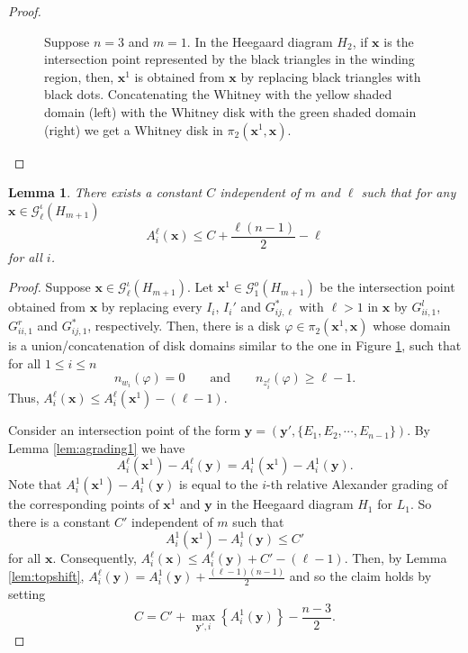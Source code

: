 \documentclass{amsart}
\newtheorem{lemma}[theorem]{Lemma}
\newcommand{\G}{\mathcal{G}}
\newcommand{\x}{\mathbf{x}}
\newcommand{\y}{\mathbf{y}}
\def\x{\mathbf{x}}
\def\y{\mathbf{y}}
\begin{document}
\begin{proof}
\begin{figure}[h]
\begin{tikzpicture}
   \end{tikzpicture}
\caption{Suppose $n=3$ and $m=1$. In the Heegaard diagram $H_{2}$, if $\x$ is the intersection point represented by the black triangles in the winding region, then, $\x^1$ is obtained from $\x$ by replacing black triangles with black dots. Concatenating the Whitney with the  yellow shaded domain (left) with the Whitney disk with the green shaded domain (right) we get a Whitney disk in $\pi_2(\x^1,\x)$.
}\label{fig:disks}
\end{figure}


\end{proof}


\begin{lemma}\label{lem:agrading2} There exists a constant $C$ independent of $m$ and $\ell$ such that for any $\x\in\mathcal{G}_{\ell}^{\iota}(H_{m+1})$ 
\[{A}^\ell_i(\x)\le C+\frac{\ell(n-1)}{2}-\ell\]
for all $i$. 
\end{lemma}

\begin{proof}
Suppose $\x\in\G^\iota_\ell(H_{m+1})$. Let $\x^1\in\mathcal{G}^{o}_1(H_{m+1})$ be the intersection point obtained from $\x$ by replacing every $I_i$, $I_i'$ and $G^*_{ij,\ell}$ with $\ell>1$ in $\x$ by $G_{ii,1}^l$, $G^r_{ii,1}$ and $G^*_{ij,1}$, respectively. Then, there is a disk $\varphi\in\pi_2(\x^1,\x)$ whose domain is a union/concatenation of disk domains similar to the one in Figure \ref{fig:disks}, such that for all $1\le i\le n$
\[n_{w_i}(\varphi)=0 \quad\quad\text{and}\quad\quad n_{z_i^\ell}(\varphi)\ge \ell-1.\]
Thus, $A_i^\ell(\x)\le A_i^\ell(\x^1)-(\ell-1)$.

Consider an intersection point of the form $\y=(\y',\{E_1,E_2,\cdots, E_{n-1}\})$. By Lemma \ref{lem:agrading1} we have
\[A_i^\ell(\x^1)-A_i^\ell(\y)=A_i^1(\x^1)-A_i^1(\y).\]
Note that $A_i^1(\x^1)-A_i^1(\y)$ is equal to the $i$-th relative Alexander grading of the corresponding points of $\x^1$ and $\y$ in the Heegaard diagram $H_1$ for  $L_1$. So there is a constant $C'$ independent of $m$ such that
\[A_i^1(\x^1)-A_i^1(\y)\le C'\]
for all $\x$.  Consequently, $A_i^\ell(\x)\le A_i^\ell(\y)+C'-(\ell-1)$. Then, by Lemma \ref{lem:topshift}, $A_i^\ell(\y)=A_i^1(\y)+\frac{(\ell-1)(n-1)}{2}$ and so the claim holds by setting
\[C=C'+\max_{\y',i}\left\{A_i^1(\y)\right\}-\frac{n-3}{2}.\]
\end{proof}
\end{document}

